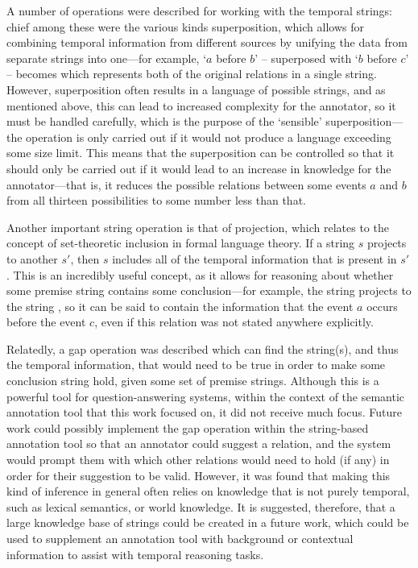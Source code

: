 \documentclass[a4paper,12pt,leqno,twoside]{article}
\newcommand{\vph}[1]{\vphantom{#1}}
\newcommand{\ebox}[1]{\fbox{$\vph{'(),}#1$}}
\newcommand{\nbBefore}[2]{\ebox{#1}\ebox{}\ebox{#2}}
\newcommand{\Before}[2]{\ebox{}\nbBefore{#1}{#2}\ebox{}}
\newcommand{\cBefore}[2]{`$#1$  before $#2$' -- \Before{#1}{#2}}
\newcommand{\EventString}[1]{%
	\renewcommand*{\do}[1]{\ebox{##1}}%
	\PipeParser{#1}%
}
\begin{document}
A number of operations were described for working with the temporal strings: chief among these were the various kinds superposition, which allows for combining temporal information from different sources by unifying the data from separate strings into one---for example, \cBefore{a}{b} superposed with \cBefore{b}{c} becomes \EventString{{}|a|{}|b|{}|c|{}} which represents both of the original relations in a single string. However, superposition often results in a language of possible strings, and as mentioned above, this can lead to increased complexity for the annotator, so it must be handled carefully, which is the purpose of the `sensible' superposition---the operation is only carried out if it would not produce a language exceeding some size limit. This means that the superposition can be controlled so that it should only be carried out if it would lead to an increase in knowledge for the annotator---that is, it reduces the possible relations between some events $a$ and $b$ from all thirteen possibilities to some number less than that.

Another important string operation is that of projection, which relates to the concept of set-theoretic inclusion in formal language theory. If a string $s$ projects to another $s'$, then $s$ includes all of the temporal information that is present in $s'$. This is an incredibly useful concept, as it allows for reasoning about whether some premise string contains some conclusion---for example, the string \EventString{{}|a|{}|b|{}|c|{}} projects to the string \Before{a}{c}, so it can be said to contain the information that the event $a$ occurs before the event $c$, even if this relation was not stated anywhere explicitly.

Relatedly, a gap operation was described which can find the string(s), and thus the temporal information, that would need to be true in order to make some conclusion string hold, given some set of premise strings. Although this is a powerful tool for question-answering systems, within the context of the semantic annotation tool that this work focused on, it did not receive much focus. Future work could possibly implement the gap operation within the string-based annotation tool so that an annotator could suggest a relation, and the system would prompt them with which other relations would need to hold (if any) in order for their suggestion to be valid. However, it was found that making this kind of inference in general often relies on knowledge that is not purely temporal, such as lexical semantics, or world knowledge. It is suggested, therefore, that a large knowledge base of strings could be created in a future work, which could be used to supplement an annotation tool with background or contextual information to assist with temporal reasoning tasks.
\end{document}
